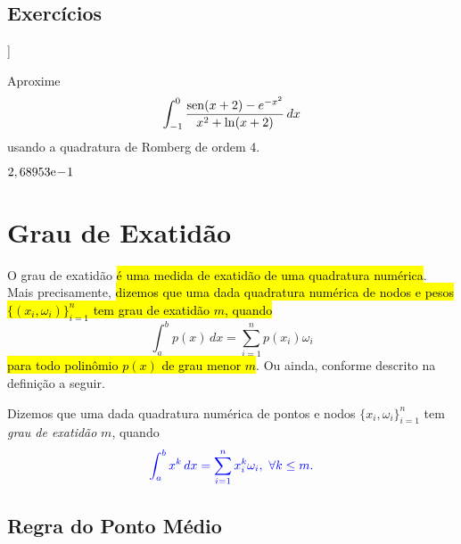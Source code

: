 \subsection*{Exercícios}

\begin{flushleft}
  [[tag:revisar]]
\end{flushleft}

\begin{exer}\label{exer:int_comp_fun}
  Aproxime
  \begin{equation}
    \int_{-1}^0 \frac{\operatorname{sen}(x+2)-e^{-x^2}}{x^2+\ln(x+2)}\,dx
  \end{equation}
usando a quadratura de Romberg de ordem 4.
\end{exer}
\begin{resp}
  $2,68953\mathrm{e}\!-\!1$
\end{resp}

\section{Grau de Exatidão}\label{cap_integr_sec_grau_exat}

O grau de exatidão \hl{é uma medida de exatidão de uma quadratura numérica}. Mais precisamente, \hl{dizemos que uma dada quadratura numérica de nodos e pesos $\{(x_i, \omega_i)\}_{i=1}^n$ tem grau de exatidão $m$, quando}
\begin{equation}
  \int_a^b p(x)\,dx = \sum_{i=1}^n p(x_i)\omega_i
\end{equation}
\hl{para todo polinômio $p(x)$ de grau menor $m$}. Ou ainda, conforme descrito na definição a seguir.

\begin{defn}
  Dizemos que uma dada quadratura numérica de pontos e nodos $\{x_i, \omega_i\}_{i=1}^n$ tem \emph{grau de exatidão} $m$, quando
  \begin{equation}\color{blue}\int_a^b x^k\,dx = \sum_{i=1}^n x_i^k\omega_i,~\forall k\leq m.
  \end{equation}
\end{defn}

\subsection{Regra do Ponto Médio}

